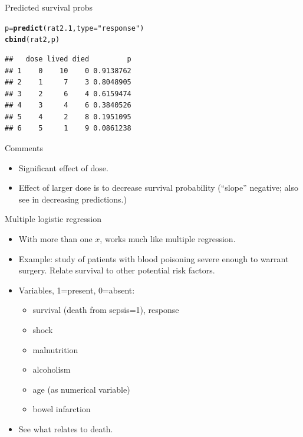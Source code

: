 \documentclass[unknownkeysallowed]{beamer}\usepackage[]{graphicx}\usepackage[]{color}
\makeatletter
\newcommand{\hlstr}[1]{\textcolor[rgb]{0.192,0.494,0.8}{#1}}%
\newcommand{\hlstd}[1]{\textcolor[rgb]{0.345,0.345,0.345}{#1}}%
\newcommand{\hlkwb}[1]{\textcolor[rgb]{0.69,0.353,0.396}{#1}}%
\newcommand{\hlkwc}[1]{\textcolor[rgb]{0.333,0.667,0.333}{#1}}%
\newcommand{\hlkwd}[1]{\textcolor[rgb]{0.737,0.353,0.396}{\textbf{#1}}}%
\newenvironment{kframe}{%
 \def\at@end@of@kframe{}%
 \ifinner\ifhmode%
  \def\at@end@of@kframe{\end{minipage}}%
  \begin{minipage}{\columnwidth}%
 \fi\fi%
 \def\FrameCommand##1{\hskip\@totalleftmargin \hskip-\fboxsep
 \colorbox{shadecolor}{##1}\hskip-\fboxsep
     \hskip-\linewidth \hskip-\@totalleftmargin \hskip\columnwidth}%
 \MakeFramed {\advance\hsize-\width
   \@totalleftmargin\z@ \linewidth\hsize
   \@setminipage}}%
 {\par\unskip\endMakeFramed%
 \at@end@of@kframe}
\newenvironment{knitrout}{}{} %
\makeatother
\begin{document}
\begin{frame}[fragile]{Predicted survival probs}

 
\begin{knitrout}
\color{fgcolor}\begin{kframe}
\begin{alltt}
\hlstd{p}\hlkwb{=}\hlkwd{predict}\hlstd{(rat2.1,}\hlkwc{type}\hlstd{=}\hlstr{"response"}\hlstd{)}
\hlkwd{cbind}\hlstd{(rat2,p)}
\end{alltt}
\begin{verbatim}
##   dose lived died         p
## 1    0    10    0 0.9138762
## 2    1     7    3 0.8048905
## 3    2     6    4 0.6159474
## 4    3     4    6 0.3840526
## 5    4     2    8 0.1951095
## 6    5     1    9 0.0861238
\end{verbatim}
\end{kframe}
\end{knitrout}
  
  

  
\end{frame}

\begin{frame}[fragile]{Comments}

\begin{itemize}
\item Significant effect of dose. 
\item Effect of larger dose is to decrease survival probability
  (``slope'' negative; also see in decreasing predictions.)
\end{itemize}
  
\end{frame}


\begin{frame}{Multiple logistic regression}

  \begin{itemize}
  \item With more than one $x$, works much like multiple regression.
  \item Example: study of patients with blood poisoning severe enough to warrant surgery. Relate survival to other potential risk factors.
  \item Variables, 1=present, 0=absent:
    \begin{itemize}
    \item survival (death from sepsis=1), response
    \item shock
    \item malnutrition
    \item alcoholism
    \item age (as numerical variable)
    \item bowel infarction
    \end{itemize}
  \item See what relates to death.
  \end{itemize}


  
\end{frame}
\end{document}
